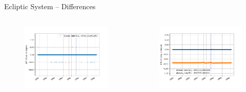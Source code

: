 \documentclass{beamer}
\begin{document}
\begin{frame}{Ecliptic System -- Differences}
\begin{columns}
	\hspace{-1cm}
	\begin{figure}									
		\includegraphics[width=1.25\textwidth]{Pics/ECL_LAT_diff.png}
	\end{figure}
	\begin{figure}									
		\includegraphics[width=1.25\textwidth]{Pics/ECL_LONG_diff.png}
	\end{figure}
\end{columns}
\end{frame}
\end{document}
